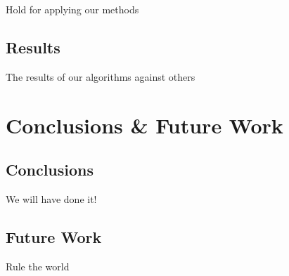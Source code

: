\documentclass{article}
\begin{document}
Hold for applying our methods

\subsection{Results} \label{results}

The results of our algorithms against others

\section{Conclusions \& Future Work}
\subsection{Conclusions}
We will have done it!
 
\subsection{Future Work}
Rule the world 



\end{document}
